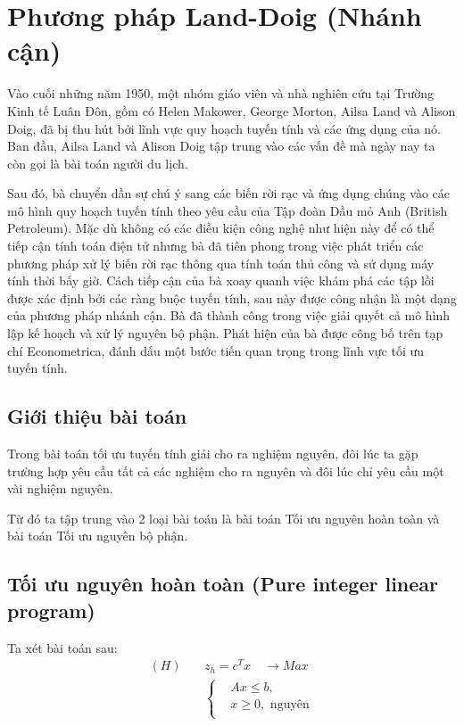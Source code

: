 \documentclass[12pt,a4paper]{report}
\begin{document}
\section{Phương pháp Land-Doig (Nhánh cận)}

Vào cuối những năm 1950, một nhóm giáo viên và nhà nghiên cứu tại Trường Kinh tế Luân Đôn, gồm có Helen Makower, George Morton, Ailsa Land và Alison Doig, đã bị thu hút bởi lĩnh vực quy hoạch tuyến tính và các ứng dụng của nó. Ban đầu, Ailsa Land và Alison Doig tập trung vào các vấn đề mà ngày nay ta còn gọi là bài toán người du lịch.

Sau đó, bà chuyển dần sự chú ý sang các biến rời rạc và ứng dụng chúng vào các mô hình quy hoạch tuyến tính theo yêu cầu của Tập đoàn Dầu mỏ Anh (British Petroleum). Mặc dù không có các điều kiện công nghệ như hiện này để có thể tiếp cận tính toán điện tử nhưng bà đã tiên phong trong việc phát triển các phương pháp xử lý biến rời rạc thông qua tính toán thủ công và sử dụng máy tính thời bấy giờ. Cách tiếp cận của bà xoay quanh việc khám phá các tập lồi được xác định bởi các ràng buộc tuyến tính, sau này được công nhận là một dạng của phương pháp nhánh cận. Bà đã thành công trong việc giải quyết cả mô hình lập kế hoạch và xử lý nguyên bộ phận. Phát hiện của bà được công bố trên tạp chí Econometrica, đánh dấu một bước tiến quan trọng trong lĩnh vực tối ưu tuyến tính.

\subsection{Giới thiệu bài toán}
Trong bài toán tối ưu tuyến tính giải cho ra nghiệm nguyên, đôi lúc ta gặp trường hợp yêu cầu tất cả các nghiệm cho ra nguyên và đôi lúc chỉ yêu cầu một vài nghiệm nguyên.

Từ đó ta tập trung vào 2 loại bài toán là bài toán Tối ưu nguyên hoàn toàn và bài toán Tối ưu nguyên bộ phận.
\subsection*{Tối ưu nguyên hoàn toàn (Pure integer linear program)}
    Ta xét bài toán sau:
    \begin{equation} \label{H}
        \begin{split}
        (H) \quad & z_h=c^Tx \quad \longrightarrow Max \\
                  & \left\{\begin{split}
                    &Ax \leq  b, \\
                    &x \geq 0, \text{ nguyên} \\
                    \end{split}\right.    
        \end{split}
        \end{equation}            
\end{document}
